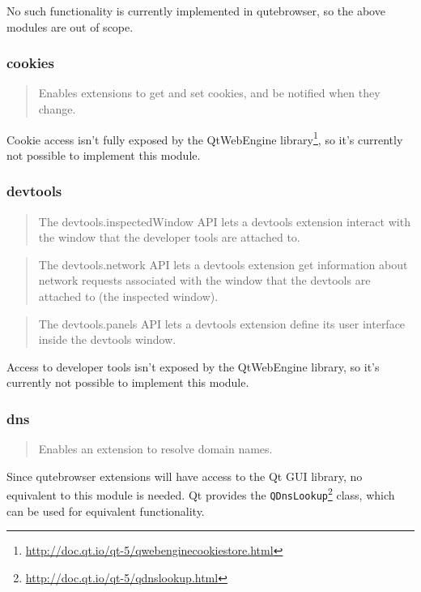 No such functionality is currently implemented in qutebrowser, so the above
modules are out of scope.

\subsubsection{cookies}
\begin{quote}
Enables extensions to get and set cookies, and be notified when they change.
\end{quote}

Cookie access isn't fully exposed by the QtWebEngine
library\footnote{\url{http://doc.qt.io/qt-5/qwebenginecookiestore.html}}, so
it's currently not possible to implement this module.

\subsubsection{devtools}
\begin{quote}
The devtools.inspectedWindow API lets a devtools extension interact with the window that the developer tools are attached to.
\end{quote}

\begin{quote}
The devtools.network API lets a devtools extension get information about network requests associated with the window that the devtools are attached to (the inspected window).
\end{quote}

\begin{quote}
The devtools.panels API lets a devtools extension define its user interface inside the devtools window.
\end{quote}

Access to developer tools isn't exposed by the QtWebEngine library, so it's
currently not possible to implement this module.

\subsubsection{dns}
\begin{quote}
Enables an extension to resolve domain names.
\end{quote}

Since qutebrowser extensions will have access to the Qt GUI library, no
equivalent to this module is needed. Qt provides the
\verb|QDnsLookup|\footnote{\url{http://doc.qt.io/qt-5/qdnslookup.html}} class, which can
be used for equivalent functionality.

